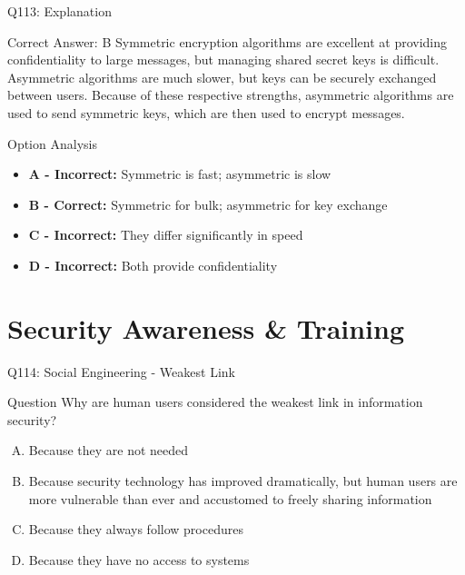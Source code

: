 \documentclass{beamer}
\begin{document}
	\begin{frame}{Q113: Explanation}
		\begin{block}{Correct Answer: B}
			Symmetric encryption algorithms are excellent at providing confidentiality to large messages, but managing shared secret keys is difficult. Asymmetric algorithms are much slower, but keys can be securely exchanged between users. Because of these respective strengths, asymmetric algorithms are used to send symmetric keys, which are then used to encrypt messages.
		\end{block}
		\begin{block}{Option Analysis}
			\begin{itemize}
				\item \textbf{A - Incorrect:} Symmetric is fast; asymmetric is slow
				\item \textbf{B - Correct:} Symmetric for bulk; asymmetric for key exchange
				\item \textbf{C - Incorrect:} They differ significantly in speed
				\item \textbf{D - Incorrect:} Both provide confidentiality
			\end{itemize}
		\end{block}
	\end{frame}
	
	
	\section{Security Awareness \& Training}
	
	\begin{frame}{Q114: Social Engineering - Weakest Link}
		\begin{block}{Question}
			Why are human users considered the weakest link in information security?
		\end{block}
		\begin{enumerate}[(A)]
			\item Because they are not needed
			\item Because security technology has improved dramatically, but human users are more vulnerable than ever and accustomed to freely sharing information
			\item Because they always follow procedures
			\item Because they have no access to systems
		\end{enumerate}
	\end{frame}
	
\end{document}
